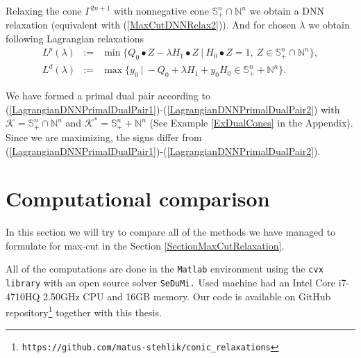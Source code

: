 \documentclass[12pt]{book}
\theoremstyle{definition}
\begin{document}
Relaxing the cone $\Gamma^{2n+1}$ with nonnegative cone $\mathbb{S}^n_+ \cap \mathbb{N}^n$ we obtain a DNN relaxation (equivalent with (\ref{MaxCutDNNRelax2})). And for chosen $\lambda$ we obtain following Lagrangian relaxations
\begin{eqnarray}
\label{MaxCutDNN3p}
L^p(\lambda) &:=& \min \{ Q_0\bullet Z  - \lambda H_1\bullet Z\ \vert \ H_0\bullet Z = 1, \ Z\in \mathbb{S}^n_+ \cap \mathbb{N}^n \}, \\
\label{MaxCutDNN3d}
L^d(\lambda) &:=& \max \{ y_0\ \vert \  - Q_0 + \lambda H_1 + y_0H_0  \in \mathbb{S}^n_+ + \mathbb{N}^n \}.
\end{eqnarray}

\rem We have formed a primal dual pair according to (\ref{LagrangianDNNPrimalDualPair1})-(\ref{LagrangianDNNPrimalDualPair2}) with $\mathcal{K}= \mathbb{S}^n_+ \cap \mathbb{N}^n $ and $\mathcal{K}^*= \mathbb{S}^n_+ + \mathbb{N}^n $ (See Example \ref{ExDualCones} in the Appendix).
Since we are maximizing, the signs differ from (\ref{LagrangianDNNPrimalDualPair1})-(\ref{LagrangianDNNPrimalDualPair2}).












%
%
%
%





\chapter{Computational comparison}

In this section we will try to compare all of the methods we have managed to formulate for max-cut in the Section \ref{SectionMaxCutRelaxation}.

All of the computations are done in the {\tt Matlab} environment using the {\tt cvx library} with an open source solver {\tt SeDuMi.} Used machine had an {Intel Core i7-4710HQ 2.50GHz CPU} and 16GB memory.
Our code is available on GitHub repository\footnote{{\tt https://github.com/matus-stehlik/conic\_relaxations}} together with this thesis.  
\end{document}
